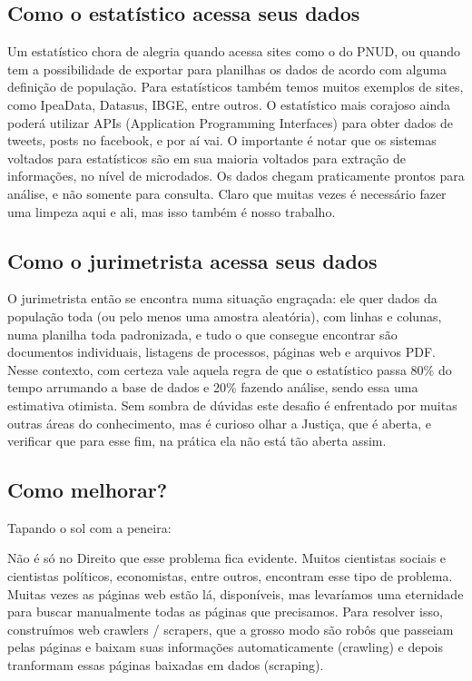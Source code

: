 \documentclass[]{book}
\begin{document}
\subsection{Como o estatístico acessa seus
dados}\label{como-o-estatistico-acessa-seus-dados}

Um estatístico chora de alegria quando acessa sites como o do PNUD, ou
quando tem a possibilidade de exportar para planilhas os dados de acordo
com alguma definição de população. Para estatísticos também temos muitos
exemplos de sites, como IpeaData, Datasus, IBGE, entre outros. O
estatístico mais corajoso ainda poderá utilizar APIs (Application
Programming Interfaces) para obter dados de tweets, posts no facebook, e
por aí vai. O importante é notar que os sistemas voltados para
estatísticos são em sua maioria voltados para extração de informações,
no nível de microdados. Os dados chegam praticamente prontos para
análise, e não somente para consulta. Claro que muitas vezes é
necessário fazer uma limpeza aqui e ali, mas isso também é nosso
trabalho.

\subsection{Como o jurimetrista acessa seus
dados}\label{como-o-jurimetrista-acessa-seus-dados}

O jurimetrista então se encontra numa situação engraçada: ele quer dados
da população toda (ou pelo menos uma amostra aleatória), com linhas e
colunas, numa planilha toda padronizada, e tudo o que consegue encontrar
são documentos individuais, listagens de processos, páginas web e
arquivos PDF. Nesse contexto, com certeza vale aquela regra de que o
estatístico passa 80\% do tempo arrumando a base de dados e 20\% fazendo
análise, sendo essa uma estimativa otimista. Sem sombra de dúvidas este
desafio é enfrentado por muitas outras áreas do conhecimento, mas é
curioso olhar a Justiça, que é aberta, e verificar que para esse fim, na
prática ela não está tão aberta assim.

\subsection{Como melhorar?}\label{como-melhorar}

Tapando o sol com a peneira:

Não é só no Direito que esse problema fica evidente. Muitos cientistas
sociais e cientistas políticos, economistas, entre outros, encontram
esse tipo de problema. Muitas vezes as páginas web estão lá,
disponíveis, mas levaríamos uma eternidade para buscar manualmente todas
as páginas que precisamos. Para resolver isso, construímos web crawlers
/ scrapers, que a grosso modo são robôs que passeiam pelas páginas e
baixam suas informações automaticamente (crawling) e depois tranformam
essas páginas baixadas em dados (scraping).
\end{document}
